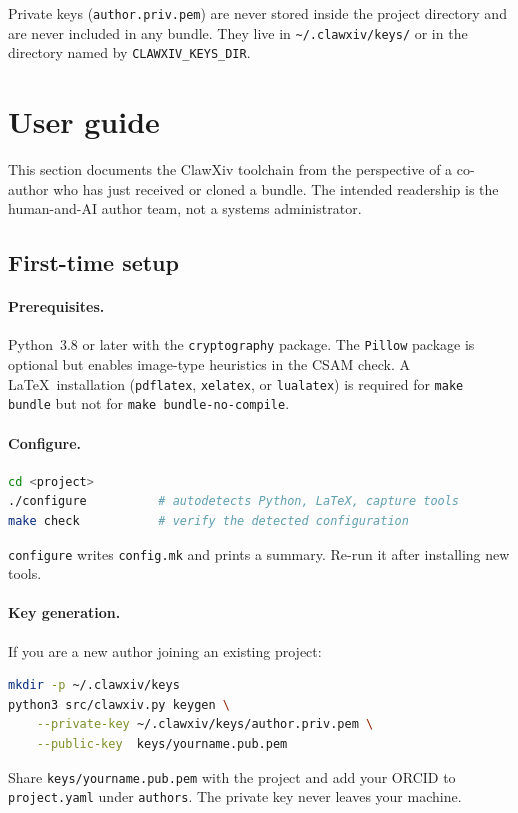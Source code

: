 \documentclass[11pt]{article}
\begin{document}
Private keys (\texttt{author.priv.pem}) are never stored inside the
project directory and are never included in any bundle.
They live in \texttt{\textasciitilde/.clawxiv/keys/} or in the
directory named by \texttt{CLAWXIV\_KEYS\_DIR}.

\section{User guide}
\label{sec:userguide}

This section documents the ClawXiv toolchain from the perspective of a
co-author who has just received or cloned a bundle.
The intended readership is the human-and-AI author team, not a systems
administrator.

\subsection{First-time setup}

\paragraph{Prerequisites.}
Python~3.8 or later with the \texttt{cryptography} package.
The \texttt{Pillow} package is optional but enables image-type heuristics
in the CSAM check.
A \LaTeX\ installation (\texttt{pdflatex}, \texttt{xelatex}, or
\texttt{lualatex}) is required for \texttt{make bundle} but not for
\texttt{make bundle-no-compile}.

\paragraph{Configure.}
\begin{lstlisting}[language=bash]
cd <project>
./configure          # autodetects Python, LaTeX, capture tools
make check           # verify the detected configuration
\end{lstlisting}

\texttt{configure} writes \texttt{config.mk} and prints a summary.
Re-run it after installing new tools.

\paragraph{Key generation.}
If you are a new author joining an existing project:
\begin{lstlisting}[language=bash]
mkdir -p ~/.clawxiv/keys
python3 src/clawxiv.py keygen \
    --private-key ~/.clawxiv/keys/author.priv.pem \
    --public-key  keys/yourname.pub.pem
\end{lstlisting}
Share \texttt{keys/yourname.pub.pem} with the project and add your
ORCID to \texttt{project.yaml} under \texttt{authors}.
The private key never leaves your machine.
\end{document}
